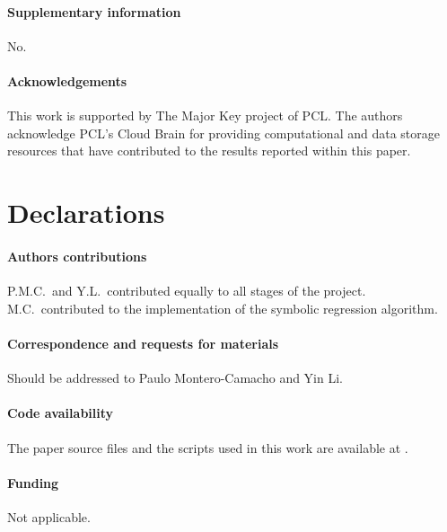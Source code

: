 \paragraph{\large Supplementary information} No.

\paragraph{\large Acknowledgements}
This work is supported by The Major Key project of PCL.
The authors acknowledge PCL's Cloud Brain for providing computational
and data storage resources that have contributed to the results reported
within this paper.

\section*{Declarations}

\paragraph{\large Authors contributions}
P.M.C.\ and Y.L.\ contributed equally to all stages of the project.
M.C.\ contributed to the implementation of the symbolic regression
algorithm.

\vspace{-1em}
\paragraph{\large Correspondence and requests for materials}
Should be addressed to Paulo Montero-Camacho and Yin Li.

\vspace{-1em}
\paragraph{\large Code availability}
The paper source files and the scripts used in this work are available
at \href{https://github.com/eelregit/5par}{\faGithub}.

\vspace{-1em}
\paragraph{\large Funding}
Not applicable.


